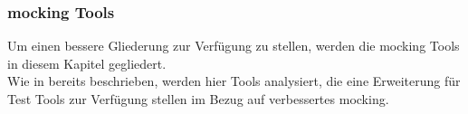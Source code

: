 \subsubsection{\Gls{mock}ing Tools}\label{python-tools:extlib:mock}

Um einen bessere Gliederung zur Verfügung zu stellen, werden die \Gls{mock}ing
Tools in diesem Kapitel gegliedert.
\\
Wie in  bereits beschrieben, werden hier Tools analysiert,
die eine Erweiterung für Test Tools zur Verfügung stellen im Bezug auf verbessertes
\gls{mock}ing.




